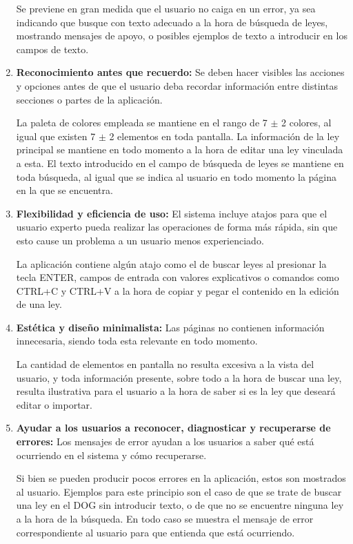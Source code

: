\begin{enumerate}
    Se previene en gran medida que el usuario no caiga en un error, ya sea indicando que busque con texto adecuado a la hora de búsqueda de leyes, mostrando mensajes de apoyo, o posibles ejemplos de texto a introducir en los campos de texto.
    
    \item {\bf Reconocimiento antes que recuerdo:} Se deben hacer visibles las acciones y opciones antes de que el usuario deba recordar información entre distintas secciones o partes de la aplicación.
    
    
    La paleta de colores empleada se mantiene en el rango de 7 $\pm$ 2 colores, al igual que existen 7 $\pm$ 2 elementos en toda pantalla. La información de la ley principal se mantiene en todo momento a la hora de editar una ley vinculada a esta. El texto introducido en el campo de búsqueda de leyes se mantiene en toda búsqueda, al igual que se indica al usuario en todo momento la página en la que se encuentra.
    
    
    \item {\bf Flexibilidad y eficiencia de uso:} El sistema incluye atajos para que el usuario experto pueda realizar las operaciones de forma más rápida, sin que esto cause un problema a un usuario menos experienciado.
    
    La aplicación contiene algún atajo como el de buscar leyes al presionar la tecla ENTER, campos de entrada con valores explicativos o comandos como CTRL+C y CTRL+V a la hora de copiar y pegar el contenido en la edición de una ley.
    
    
    \item {\bf Estética y diseño minimalista:} Las páginas no contienen información innecesaria, siendo toda esta relevante en todo momento.
    
    La cantidad de elementos en pantalla no resulta excesiva a la vista del usuario, y toda información presente, sobre todo a la hora de buscar una ley, resulta ilustrativa para el usuario a la hora de saber si es la ley que deseará editar o importar.
    
    
    \item {\bf Ayudar a los usuarios a reconocer, diagnosticar y recuperarse de errores:} Los mensajes de error ayudan a los usuarios a saber qué está ocurriendo en el sistema y cómo recuperarse.
    
    Si bien se pueden producir pocos errores en la aplicación, estos son mostrados al usuario. Ejemplos para este principio son el caso de que se trate de buscar una ley en el DOG sin introducir texto, o de que no se encuentre ninguna ley a la hora de la búsqueda. En todo caso se muestra el mensaje de error correspondiente al usuario para que entienda que está ocurriendo.
    

\end{enumerate}
